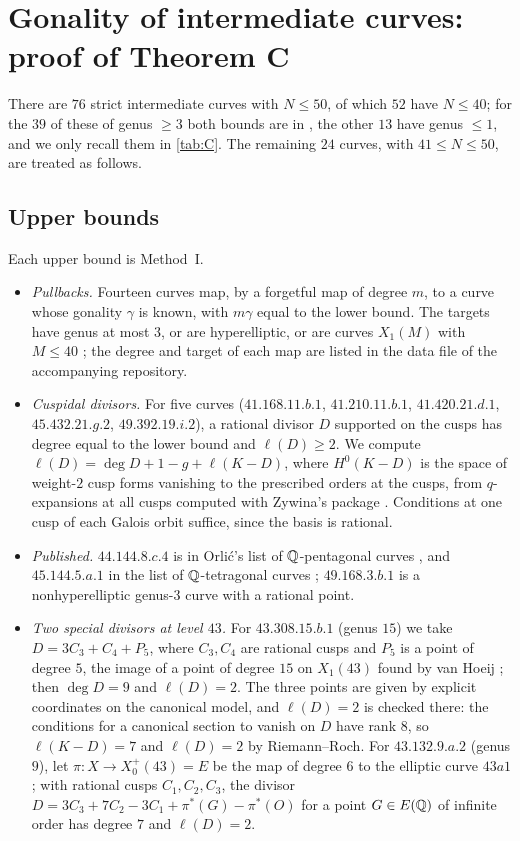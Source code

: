 \section{Gonality of intermediate curves: proof of Theorem C}\label{sec:gonality-intermediate}

There are $76$ strict intermediate curves with $N\le50$, of which $52$ have $N\le40$; for the $39$ of these of genus $\ge3$ both bounds
are in \cite[Theorem~1.2, Table~1]{Orlic2025}, the other $13$ have genus $\le1$, and we only recall them in \cref{tab:C}. The remaining $24$
curves, with $41\le N\le50$, are treated as follows.

\subsection{Upper bounds}
Each upper bound is Method~I.
\begin{itemize}
\item \emph{Pullbacks.} Fourteen curves map, by a forgetful map of degree $m$, to a curve whose gonality $\gamma$
 is known, with $m\gamma$ equal to the lower bound. The targets have genus at most $3$, or are hyperelliptic,
 or are curves $X_1(M)$ with $M\le 40$ \cite{DerickxVanHoeij2014}; the degree and target of each map are listed in
the data file of the accompanying repository.
\item \emph{Cuspidal divisors.} For five curves ($41.168.11.b.1$, $41.210.11.b.1$, $41.420.21.d.1$,
 $45.432.21.g.2$, $49.392.19.i.2$), a rational divisor $D$ supported on the cusps has degree equal to the
 lower bound and $\ell(D)\ge2$. We compute $\ell(D)=\deg D+1-g+\ell(K-D)$, where $H^0(K-D)$ is the space of
 weight-$2$ cusp forms vanishing to the prescribed orders at the cusps, from $q$-expansions at all cusps
 computed with Zywina's package \cite{ZywinaModular}. Conditions at one cusp of each Galois orbit suffice,
 since the basis is rational.
\item \emph{Published.} $44.144.8.c.4$ is in Orli\'c's list of $\mathbb{Q}$-pentagonal curves
 \cite[Theorems~1.4--1.5]{Orlic2025}, and $45.144.5.a.1$ in the list of $\mathbb{Q}$-tetragonal curves
 \cite[Theorem~1.3]{Orlic2025}; $49.168.3.b.1$ is a nonhyperelliptic genus-$3$
 curve with a rational point.
\item \emph{Two special divisors at level $43$.} For $43.308.15.b.1$ (genus $15$) we take $D=3C_3+C_4+P_5$, where
 $C_3,C_4$ are rational cusps and $P_5$ is a point of degree $5$, the image of a point of degree $15$ on
 $X_1(43)$ found by van Hoeij \cite{vanHoeij2012}; then $\deg D=9$ and $\ell(D)=2$. The three points are given
 by explicit coordinates on the canonical model, and $\ell(D)=2$ is checked there: the conditions for a canonical
 section to vanish on $D$ have rank $8$, so $\ell(K-D)=7$ and $\ell(D)=2$ by Riemann--Roch. For $43.132.9.a.2$
 (genus $9$), let $\pi\colon X\to X_0^+(43)=E$ be the map of degree $6$ to the elliptic curve $43a1$; with rational
 cusps $C_1,C_2,C_3$, the divisor $D=3C_3+7C_2-3C_1+\pi^*(G)-\pi^*(O)$ for a point $G\in E(\mathbb{Q})$ of infinite
 order has degree $7$ and $\ell(D)=2$.
\end{itemize}

